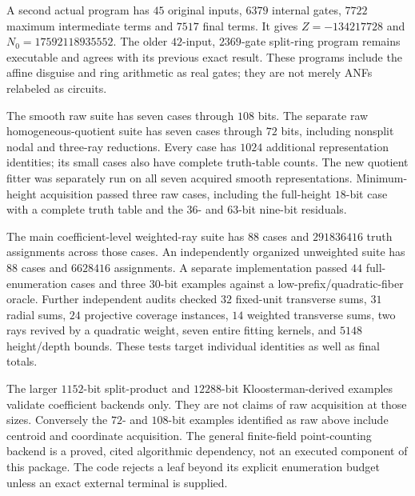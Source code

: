 \documentclass[11pt]{article}
\theoremstyle{remark}\newtheorem{remark}[theorem]{Remark}
\begin{document}
A second actual program has $45$ original inputs, $6379$ internal gates,
$7722$ maximum intermediate terms and $7517$ final terms. It gives
$Z=-134217728$ and $N_0=17592118935552$. The older $42$-input,
$2369$-gate split-ring program remains executable and agrees with its
previous exact result. These programs include the affine disguise and
ring arithmetic as real gates; they are not merely ANFs relabeled as
circuits.

The smooth raw suite has seven cases through $108$ bits. The separate
raw homogeneous-quotient suite has seven cases through $72$ bits,
including nonsplit nodal and three-ray reductions. Every case has $1024$
additional representation identities; its small cases also have complete
truth-table counts. The new quotient fitter was separately run on all
seven acquired smooth representations. Minimum-height acquisition passed
three raw cases, including the full-height $18$-bit case with a complete
truth table and the $36$- and $63$-bit nine-bit residuals.

The main coefficient-level weighted-ray suite has $88$ cases and
$291836416$ truth assignments across those cases. An independently
organized unweighted suite has $88$ cases and $6628416$ assignments.
A separate implementation passed $44$ full-enumeration cases and three
$30$-bit examples against a low-prefix/quadratic-fiber oracle.
Further independent audits checked $32$ fixed-unit transverse sums,
$31$ radial sums, $24$ projective coverage instances, $14$ weighted
transverse sums, two rays revived by a quadratic weight, seven entire
fitting kernels, and $5148$ height/depth bounds. These tests target
individual identities as well as final totals.

The larger $1152$-bit split-product and $12288$-bit Kloosterman-derived
examples validate coefficient backends only. They are not claims of raw
acquisition at those sizes. Conversely the $72$- and $108$-bit examples
identified as raw above include centroid and coordinate acquisition.
The general finite-field point-counting backend is a proved, cited
algorithmic dependency, not an executed component of this package.
The code rejects a leaf beyond its explicit enumeration budget unless
an exact external terminal is supplied.

\clearpage

\end{document}
